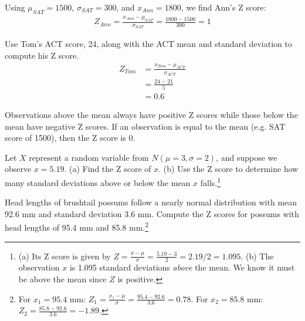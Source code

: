 Using $\mu_{SAT}=1500$, $\sigma_{SAT}=300$, and $x_{Ann}=1800$, we find Ann's Z score:
\begin{eqnarray*}
Z_{Ann} = \frac{x_{Ann} - \mu_{SAT}}{\sigma_{SAT}} = \frac{1800-1500}{300} = 1
\end{eqnarray*}




\begin{example}{Use Tom's ACT score, 24, along with the ACT mean and standard deviation to compute his Z score.}
\begin{align*}
Z_{Tom} 	& = \frac{x_{Tom} - \mu_{ACT}}{\sigma_{ACT}}	\\[1.5mm]
		& = \frac{24 - 21}{5} \\[1.5mm]
		& = 0.6
\end{align*}
\end{example}

Observations above the mean always have positive Z scores while those below the mean have negative Z scores. If an observation is equal to the mean (e.g. SAT score of 1500), then the Z score is $0$.

\begin{exercise}
Let $X$ represent a random variable from $N(\mu=3, \sigma=2)$, and suppose we observe $x=5.19$. (a) Find the Z score of $x$. (b) Use the Z score to determine how many standard deviations above or below the mean $x$ falls.\footnote{(a) Its Z score is given by $Z = \frac{x-\mu}{\sigma} = \frac{5.19 - 3}{2} = 2.19/2 = 1.095$. (b) The observation $x$ is 1.095 standard deviations \emph{above} the mean. We know it must be above the mean since $Z$ is positive.}
\end{exercise}

\begin{exercise} \label{headLZScore}
Head lengths of brushtail possums follow a nearly normal distribution with mean 92.6 mm and standard deviation 3.6 mm. Compute the Z scores for possums with head lengths of 95.4 mm and 85.8 mm.\footnote{For $x_1=95.4$ mm: $Z_1 = \frac{x_1 - \mu}{\sigma} = \frac{95.4 - 92.6}{3.6} = 0.78$. For $x_2=85.8$ mm: $Z_2 = \frac{85.8 - 92.6}{3.6} = -1.89$.}
\end{exercise}

